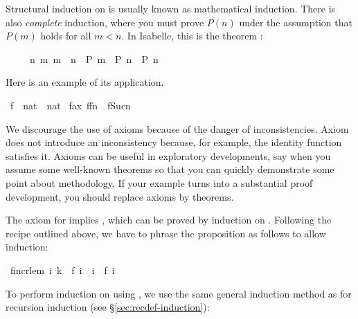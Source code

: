 \begin{isabellebody}
\begin{isamarkuptext}
Structural induction on  is
usually known as mathematical induction. There is also \emph{complete}
induction, where you must prove $P(n)$ under the assumption that $P(m)$
holds for all $m<n$. In Isabelle, this is the theorem :
\begin{isabelle}%
\ \ \ \ \ {\isacharparenleft}{\isasymAnd}n{\isachardot}\ {\isasymforall}m{\isachardot}\ m\ {\isacharless}\ n\ {\isasymlongrightarrow}\ P\ m\ {\isasymLongrightarrow}\ P\ n{\isacharparenright}\ {\isasymLongrightarrow}\ P\ n%
\end{isabelle}
Here is an example of its application.%
\end{isamarkuptext}%
\ f\ {\isacharcolon}{\isacharcolon}\ {\isachardoublequote}nat\ {\isasymRightarrow}\ nat{\isachardoublequote}\isanewline
{}\ f{\isacharunderscore}ax{\isacharcolon}\ {\isachardoublequote}f{\isacharparenleft}f{\isacharparenleft}n{\isacharparenright}{\isacharparenright}\ {\isacharless}\ f{\isacharparenleft}Suc{\isacharparenleft}n{\isacharparenright}{\isacharparenright}{\isachardoublequote}%
\begin{isamarkuptext}%
\begin{warn}
We discourage the use of axioms because of the danger of
inconsistencies.  Axiom  does
not introduce an inconsistency because, for example, the identity function
satisfies it.  Axioms can be useful in exploratory developments, say when 
you assume some well-known theorems so that you can quickly demonstrate some
point about methodology.  If your example turns into a substantial proof
development, you should replace axioms by theorems.
\end{warn}\noindent
The axiom for  implies , which can
be proved by induction on \mbox{}. Following the recipe outlined
above, we have to phrase the proposition as follows to allow induction:%
\end{isamarkuptext}%
\ f{\isacharunderscore}incr{\isacharunderscore}lem{\isacharcolon}\ {\isachardoublequote}{\isasymforall}i{\isachardot}\ k\ {\isacharequal}\ f\ i\ {\isasymlongrightarrow}\ i\ {\isasymle}\ f\ i{\isachardoublequote}%
\begin{isamarkuptxt}%
\noindent
To perform induction on  using , we use
the same general induction method as for recursion induction (see
\S\ref{sec:recdef-induction}):%
\end{isamarkuptxt}%

\end{isabellebody}
